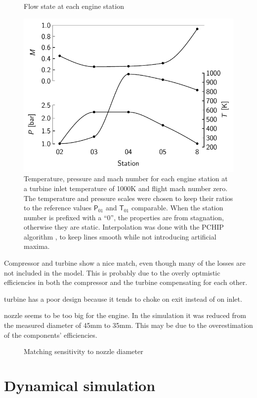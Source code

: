 \documentclass[tcc]{subfiles}
\begin{document}
\begin{figure}
    \centering
    \caption{Flow state at each engine station}
    \includegraphics{fig/stations1000K}
    \caption*{Temperature, pressure and mach number for each engine station at a turbine inlet temperature of 1000K and flight mach number zero. The temperature and pressure scales were chosen to keep their ratios to the reference values $\mathsf P_{01}$ and $\mathsf T_{01}$ comparable. When the station number is prefixed with a ``0'', the properties are from stagnation, otherwise they are static. Interpolation was done with the PCHIP algorithm \cite{Fritsch1980}, to keep lines smooth while not introducing artificial maxima.}
\end{figure}

Compressor and turbine show a nice match, even though many of the losses are not included in the model.
This is probably due to the overly optmistic efficiencies in both the compressor and the turbine compensating for each other.

turbine has a poor design because it tends to choke on exit instead of on inlet.

nozzle seems to be too big for the engine. In the simulation it was reduced from the measured diameter of 45mm to 35mm. This may be due to the overestimation of the components' efficiencies.


\begin{figure}
    \caption{Matching sensitivity to nozzle diameter}
\end{figure}

\section{Dynamical simulation}
\end{document}
